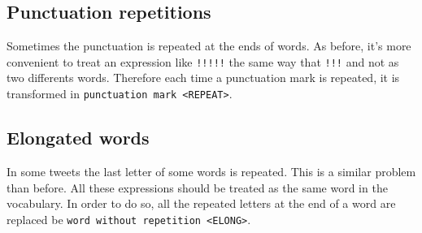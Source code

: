 \subsection{Punctuation repetitions}
Sometimes the punctuation is repeated at the ends of words. As before, it's more convenient to treat an expression like \texttt{!!!!!} the same way that \texttt{!!!} and not as two differents words. Therefore each time a punctuation mark is repeated, it is transformed in \texttt{punctuation mark <REPEAT>}. 

\subsection{Elongated words}
In some tweets the last letter of some words is repeated. This is a similar problem than before. All these expressions should be treated as the same word in the vocabulary. In order to do so, all the repeated letters at the end of a word are replaced be \texttt{word without repetition <ELONG>}.


\label{sec:processing}


